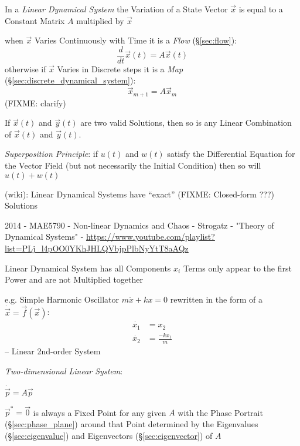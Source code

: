 In a \emph{Linear Dynamical System} the Variation of a State Vector $\vec{x}$
is equal to a Constant Matrix $A$ multiplied by $\vec{x}$

when $\vec{x}$ Varies Continuously with Time it is a \emph{Flow}
(\S\ref{sec:flow}):
\[
  \frac{d}{dt}\vec{x}(t) = A\vec{x}(t)
\]
otherwise if $\vec{x}$ Varies in Discrete steps it is a \emph{Map}
(\S\ref{sec:discrete_dynamical_system}):
\[
  \vec{x}_{m+1} = A\vec{x}_m
\]
(FIXME: clarify)

If $\vec{x}(t)$ and $\vec{y}(t)$ are two valid Solutions, then so is any Linear
Combination of $\vec{x}(t)$ and $\vec{y}(t)$.

\emph{Superposition Principle}: if $u(t)$ and $w(t)$ satisfy the Differential
Equation for the Vector Field (but not necessarily the Initial Condition) then
so will $u(t) + w(t)$

(wiki): Linear Dynamical Systems have ``exact'' (FIXME: Closed-form ???)
Solutions

\asterism

2014 - MAE5790 - Non-linear Dynamics and Chaos - Strogatz - "Theory of
Dynamical Systems" -
\url{https://www.youtube.com/playlist?list=PLj_l4pOO0YKhJHLQVbjpPlbNyYtT8aAQz}

Linear Dynamical System has all Components $x_i$ Terms only appear to the first
Power and are not Multiplied together

e.g. Simple Harmonic Oscillator $m\ddot{x} + kx = 0$
rewritten in the form of a $\dot{\vec{x}} = \vec{f}(\vec{x})$:
\begin{align*}
  \dot{x_1} & = x_2 \\
  \dot{x_2} & = \frac{-kx_1}{m}
\end{align*}
-- Linear 2nd-order System

\emph{Two-dimensional Linear System}:

$\dot{\vec{p}} = A\vec{p}$

$\vec{p}^* = \vec{0}$ is always a Fixed Point for any given $A$ with the Phase
Portrait (\S\ref{sec:phase_plane}) around that Point determined by the
Eigenvalues (\S\ref{sec:eigenvalue}) and Eigenvectors (\S\ref{sec:eigenvector})
of $A$

